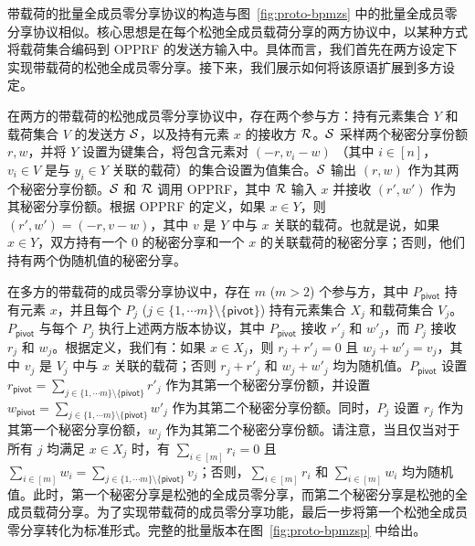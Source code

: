 带载荷的批量全成员零分享协议的构造与图~\ref{fig:proto-bpmzs} 中的批量全成员零分享协议相似。核心思想是在每个松弛全成员载荷分享的两方协议中，以某种方式将载荷集合编码到 OPPRF 的发送方输入中。具体而言，我们首先在两方设定下实现带载荷的松弛全成员零分享。接下来，我们展示如何将该原语扩展到多方设定。

在两方的带载荷的松弛成员零分享协议中，存在两个参与方：持有元素集合 $Y$ 和载荷集合 $V$ 的发送方 $\mathcal{S}$，以及持有元素 $x$ 的接收方 $\mathcal{R}$。$\mathcal{S}$ 采样两个秘密分享份额 $r, w$，并将 $Y$ 设置为键集合，将包含元素对 $(-r, v_i - w)$ （其中 $i \in [n]$，$v_i \in V$ 是与 $y_i \in Y$ 关联的载荷）的集合设置为值集合。$\mathcal{S}$ 输出 $(r, w)$ 作为其两个秘密分享份额。$\mathcal{S}$ 和 $\mathcal{R}$ 调用 OPPRF，其中 $\mathcal{R}$ 输入 $x$ 并接收 $(r', w')$ 作为其秘密分享份额。根据 OPPRF 的定义，如果 $x \in Y$，则 $(r', w') = (-r, v - w)$，其中 $v$ 是 $Y$ 中与 $x$ 关联的载荷。也就是说，如果 $x \in Y$，双方持有一个 0 的秘密分享和一个 $x$ 的关联载荷的秘密分享；否则，他们持有两个伪随机值的秘密分享。

在多方的带载荷的成员零分享协议中，存在 $m$ ($m>2$) 个参与方，其中 $P_\mathsf{pivot}$ 持有元素 $x$，并且每个 $P_j$ ($j \in \{1,\cdots m\} \setminus \{\mathsf{pivot}\}$) 持有元素集合 $X_j$ 和载荷集合 $V_j$。$P_\mathsf{pivot}$ 与每个 $P_j$ 执行上述两方版本协议，其中 $P_\mathsf{pivot}$ 接收 $r'_j$ 和 $w'_j$，而 $P_j$ 接收 $r_j$ 和 $w_j$。根据定义，我们有：如果 $x \in X_j$，则 $r_j + r'_j = 0$ 且 $w_j + w'_j = v_j$，其中 $v_j$ 是 $V_j$ 中与 $x$ 关联的载荷；否则 $r_j + r'_j$ 和 $w_j + w'_j$ 均为随机值。$P_\mathsf{pivot}$ 设置 $r_\mathsf{pivot} = \sum_{j \in \{1,\cdots m\} \setminus \{\mathsf{pivot}\}} r'_j$ 作为其第一个秘密分享份额，并设置 $w_\mathsf{pivot} = \sum_{j \in \{1,\cdots m\} \setminus \{\mathsf{pivot}\}} w'_j$ 作为其第二个秘密分享份额。同时，$P_j$ 设置 $r_j$ 作为其第一个秘密分享份额，$w_j$ 作为其第二个秘密分享份额。请注意，当且仅当对于所有 $j$ 均满足 $x \in X_j$ 时，有 $\sum_{i \in [m]} r_i = 0$ 且 $\sum_{i \in [m]} w_i = \sum_{j \in \{1,\cdots m\} \setminus \{\mathsf{pivot}\}} v_j$；否则，$\sum_{i \in [m]} r_i$ 和 $\sum_{i \in [m]} w_i$ 均为随机值。此时，第一个秘密分享是松弛的全成员零分享，而第二个秘密分享是松弛的全成员载荷分享。为了实现带载荷的成员零分享功能，最后一步将第一个松弛全成员零分享转化为标准形式。完整的批量版本在图~\ref{fig:proto-bpmzsp} 中给出。

